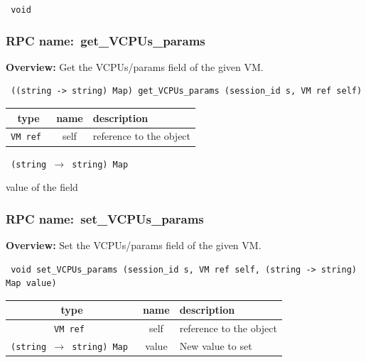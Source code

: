 \vspace{0.3cm}

{\tt 
void
}



\vspace{0.3cm}
\vspace{0.3cm}
\vspace{0.3cm}
\subsubsection{RPC name:~get\_VCPUs\_params}

{\bf Overview:} 
Get the VCPUs/params field of the given VM.

\begin{verbatim} ((string -> string) Map) get_VCPUs_params (session_id s, VM ref self)\end{verbatim}



 
\vspace{0.3cm}
\begin{tabular}{|c|c|p{7cm}|}
 \hline
{\bf type} & {\bf name} & {\bf description} \\ \hline
{\tt VM ref } & self & reference to the object \\ \hline 

\end{tabular}

\vspace{0.3cm}

{\tt 
(string $\rightarrow$ string) Map
}


value of the field
\vspace{0.3cm}
\vspace{0.3cm}
\vspace{0.3cm}
\subsubsection{RPC name:~set\_VCPUs\_params}

{\bf Overview:} 
Set the VCPUs/params field of the given VM.

\begin{verbatim} void set_VCPUs_params (session_id s, VM ref self, (string -> string) Map value)\end{verbatim}



 
\vspace{0.3cm}
\begin{tabular}{|c|c|p{7cm}|}
 \hline
{\bf type} & {\bf name} & {\bf description} \\ \hline
{\tt VM ref } & self & reference to the object \\ \hline 

{\tt (string $\rightarrow$ string) Map } & value & New value to set \\ \hline 

\end{tabular}

